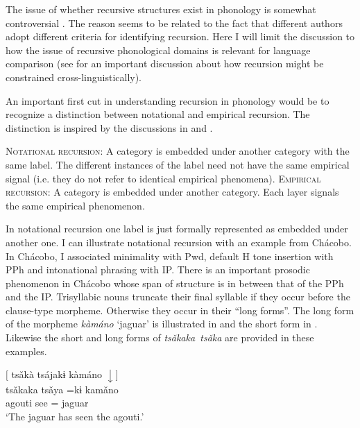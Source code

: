 \documentclass[output=paper,hidelinks]{langscibook}
\begin{document}

The issue of whether recursive structures exist in phonology is somewhat controversial \citep{fery2017intonation, tallman2021caroline, ishihara2023match, kugler2023phrase, boegel2021function, cheng2021recursion, ito2021recursive,miller2021is}. The reason seems to be related to the fact that different authors adopt different criteria for identifying recursion. Here I will limit the discussion to how the issue of recursive phonological domains is relevant for language comparison (see \cite{miller2021is} for an important discussion about how recursion might be constrained cross-linguistically).

An important first cut in understanding recursion in phonology would be to recognize a distinction between notational and empirical recursion. The distinction is inspired by the discussions in \citet{schiering2010prosodic} and \citet{miller2021is}.

\ea 
    \ea \textsc{Notational recursion}: A category is embedded under another category with the same label. The different instances of the label need not have the same empirical signal (i.e. they do not refer to identical empirical phenomena).
    \ex \textsc{Empirical recursion}: A category is embedded under another category. Each layer signals the same empirical phenomenon.
    \z
\z 

In notational recursion one label is just formally represented as embedded under another one. I can illustrate notational recursion with an example from Chácobo. In Chácobo, I associated minimality with Pwd, default H tone insertion with PPh and intonational phrasing with IP. There is an important prosodic phenomenon in Chácobo whose span of structure is in between that of the PPh and the IP. Trisyllabic nouns truncate their final syllable if they occur before the clause-type morpheme. Otherwise they occur in their ``long forms''. The long form of the morpheme \textit{kàmáno} `jaguar' is illustrated in  and the short form in . Likewise the short and long forms of \textit{tsǎkaka~tsǎka} are provided in these examples.

\ea \label{ex:chacobo14}
    $[$ tsǎkà tsájakɨ kàmáno $\downarrow]$  \\   
    \gll tsǎkaka tsǎya =kɨ kamǎno \\
    agouti see =\Ant{} jaguar \\ 
    \glt `The jaguar has seen the agouti.'
\z 
\end{document}
